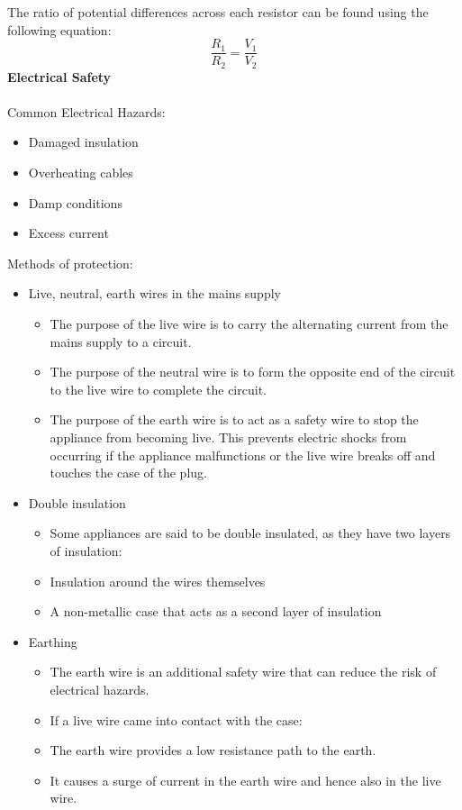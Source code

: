 \documentclass[a4paper,12pt]{article}
\begin{document}
The ratio of potential differences across each resistor can be found using the following equation:
\[\frac{R_1}{R_2}=\frac{V_1}{V_2}\]
\textbf{Electrical Safety}\\\\
Common Electrical Hazards:
\begin{itemize}
    \item Damaged insulation
    \item Overheating cables
    \item Damp conditions
    \item Excess current
\end{itemize}
Methods of protection:
\begin{itemize}
    \item Live, neutral, earth wires in the mains supply
    \begin{itemize}
        \item The purpose of the live wire is to carry the alternating current from the mains supply to a circuit.
        \item The purpose of the neutral wire is to form the opposite end of the circuit to the live wire to complete the circuit.
        \item The purpose of the earth wire is to act as a safety wire to stop the appliance from becoming live. This prevents electric shocks from occurring if the appliance malfunctions or the live wire breaks off and touches the case of the plug.
    \end{itemize}
    \item Double insulation
    \begin{itemize}
        \item Some appliances are said to be double insulated, as they have two layers of insulation:
        \item Insulation around the wires themselves
        \item A non-metallic case that acts as a second layer of insulation
    \end{itemize}
    \item Earthing
    \begin{itemize}
        \item The earth wire is an additional safety wire that can reduce the risk of electrical hazards.
        \item If a live wire came into contact with the case:
        \item The earth wire provides a low resistance path to the earth.
        \item It causes a surge of current in the earth wire and hence also in the live wire.

\end{itemize}
\end{itemize}
\end{document}
